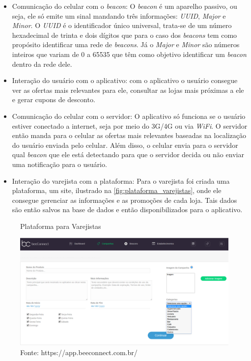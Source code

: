 \begin{itemize}
\item Comunicação do celular com o \textit{beacon}: O \textit{beacon} é um aparelho passivo, ou seja, ele só emite um sinal mandando três informações: \textit{UUID}, \textit{Major} e \textit{Minor}. O \textit{UUID} é o identificador único universal, trata-se de um número hexadecimal de trinta e dois dígitos que para o caso dos \textit{beacons} tem como propósito identificar uma rede de \textit{beacons}. Já o \textit{Major} e \textit{Minor} são números inteiros que variam de 0 a 65535 que têm como objetivo identificar um \textit{beacon} dentro da rede dele.
\item Interação do usuário com o aplicativo: com o aplicativo o usuário consegue ver as ofertas mais relevantes para ele, consultar as lojas mais próximas a ele e gerar cupons de desconto.
\item Comunicação do celular com o servidor: O aplicativo só funciona se o usuário estiver conectado a internet, seja por meio do 3G/4G ou via \textit{WiFi}. O servidor então manda para o celular as ofertas mais relevantes baseadas na localização do usuário enviada pelo celular. Além disso, o celular envia para o servidor qual \textit{beacon} que ele está detectando para que o servidor decida ou não enviar uma notificação para o usuário.
\item Interação do varejista com a plataforma: Para o varejista foi criada uma plataforma, um site, ilustrado na \autoref{fig:plataforma_varejistas}, onde ele consegue gerenciar as informações e as promoções de cada loja. Tais dados são então salvos na base de dados e então disponibilizados para o aplicativo.
\end{itemize}

\begin{figure}[H]
\caption{Plataforma para Varejistas}
\centerline{\includegraphics[scale=0.3]{img/plataforma_varejistas}}
\label{fig:plataforma_varejistas}
\caption* {Fonte: https://app.beeconnect.com.br/}
\end{figure}

